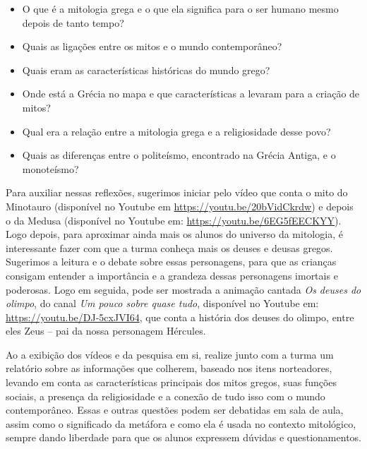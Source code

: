 \documentclass[11pt]{extarticle}
\begin{document}
\begin{itemize}
\item O que é a mitologia grega e o que ela significa para o ser humano mesmo depois de tanto tempo?
\item Quais as ligações entre os mitos e o mundo contemporâneo?
\item Quais eram as características históricas do mundo grego?
\item Onde está a Grécia no mapa e que características a levaram para a criação de mitos?
\item Qual era a relação entre a mitologia grega e a religiosidade desse povo?
\item Quais as diferenças entre o politeísmo, encontrado na Grécia Antiga, e o monoteísmo? %
\end{itemize}



Para auxiliar nessas reflexões, sugerimos iniciar pelo vídeo que conta o mito do Minotauro (disponível no Youtube em \url{https://youtu.be/20bVidCkrdw}) e depois o da Medusa (disponível no Youtube em: \url{https://youtu.be/6EG5fEECKYY}). Logo depois, para aproximar ainda mais os alunos do universo da mitologia, é interessante fazer com que a turma conheça mais os deuses e deusas gregos. Sugerimos a leitura e o debate sobre essas personagens, para que as crianças consigam entender a importância e a grandeza dessas personagens imortais e poderosas. Logo em seguida, pode ser mostrada a animação cantada \textit{Os deuses do olimpo}, do canal \textit{Um pouco sobre quase tudo}, disponível no Youtube em: \url{https://youtu.be/DJ-5cxJVI64}, que conta a história dos deuses do olimpo, entre eles Zeus -- pai da nossa personagem Hércules. 


Ao a exibição dos vídeos e da pesquisa em si, realize junto com a turma um relatório sobre as informações que colherem, baseado nos itens norteadores, levando em conta as características principais dos mitos gregos, suas funções sociais, a presença da religiosidade e a conexão de tudo isso com o mundo contemporâneo. Essas e outras questões podem ser debatidas em sala de aula, assim como o significado da metáfora e como ela é usada no contexto mitológico, sempre dando liberdade para que os alunos expressem dúvidas e questionamentos.
\end{document}
